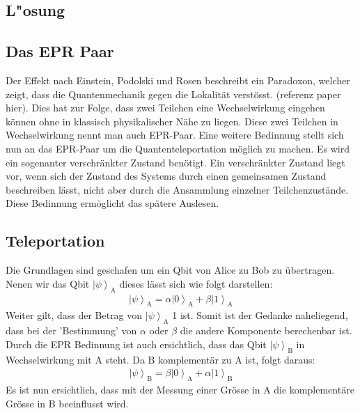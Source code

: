 \begin{refsection}
\section{L"osung}
\subsection{Das EPR Paar}
Der Effekt nach Einstein, Podolski und Rosen beschreibt ein Paradoxon, welcher zeigt, dass die Quantenmechanik gegen die Lokalität verstösst. (referenz paper hier). Dies hat zur Folge, dass zwei Teilchen eine Wechselwirkung eingehen können ohne in klassisch physikalischer Nähe zu liegen. Diese zwei Teilchen in Wechselwirkung nennt man auch EPR-Paar. Eine weitere Bedinnung stellt sich nun an das EPR-Paar um die Quantenteleportation möglich zu machen. Es wird ein sogenanter verschränkter Zustand benötigt. Ein verschränkter Zustand liegt vor, wenn sich der Zustand des Systems durch einen gemeinsamen Zustand beschreiben lässt, nicht aber durch die Ansammlung einzelner Teilchenzustände. Diese Bedinnung ermöglicht das spätere Auslesen.
\subsection{Teleportation}
Die Grundlagen sind geschafen um ein Qbit von Alice zu Bob zu übertragen. Nenen wir das Qbit $ \left|\psi\right\rangle_\mathrm A $ dieses lässt sich wie folgt darstellen:
\begin{align*}
\left|\psi\right\rangle_\mathrm A = \alpha \left|0\right\rangle_\mathrm A + \beta\left|1\right\rangle_\mathrm A
\end{align*}
Weiter gilt, dass der Betrag von $ \left|\psi\right\rangle_\mathrm A$ 1 ist. Somit ist der Gedanke naheliegend, dass bei der 'Bestimmung' von $\alpha$ oder $\beta$ die andere Komponente berechenbar ist. Durch die EPR Bedinnung ist auch ersichtlich, dass das Qbit $ \left|\psi\right\rangle_\mathrm B $ in Wechselwirkung mit A steht. Da B komplementär zu A ist, folgt daraus:
\begin{align*}
\left|\psi\right\rangle_\mathrm B = \beta \left|0\right\rangle_\mathrm A + \alpha\left|1\right\rangle_\mathrm B
\end{align*}
Es ist nun ersichtlich, dass mit der Messung einer Grösse in A die komplementäre Grösse in B beeinflusst wird.

\end{refsection}

